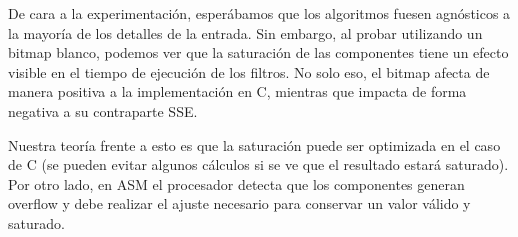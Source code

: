 De cara a la experimentación, esperábamos que los algoritmos fuesen agnósticos a la mayoría de los detalles de la entrada. Sin embargo, al probar utilizando un bitmap blanco, podemos ver que la saturación de las componentes tiene un efecto visible en el tiempo de ejecución de los filtros. No solo eso, el bitmap afecta de manera positiva a la implementación en C, mientras que impacta de forma negativa a su contraparte SSE.

Nuestra teoría frente a esto es que la saturación puede ser optimizada en el caso de C (se pueden evitar algunos cálculos si se ve que el resultado estará saturado). Por otro lado, en ASM el procesador detecta que los componentes generan overflow y debe realizar el ajuste necesario para conservar un valor válido y saturado.